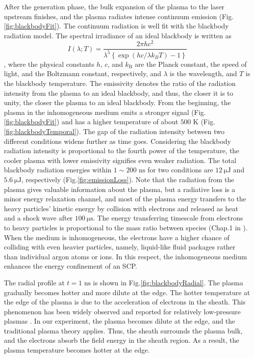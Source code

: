 After the generation phase, the bulk expansion of the plasma to the laser upstream finishes, and the plasma radiates intense continuum emission (Fig.\ref{fig:blackbodyFit}). The continuum radiation is well fit with the blackbody radiation model. The spectral irradiance of an ideal blackbody is written as
\begin{equation}
I \left( \lambda ; T \right) = \frac{2 \pi h c^{2}}{\lambda^{5}\left\{\exp \left(h c / \lambda k_{B} T\right)-1\right\}}
\end{equation}
, where the physical constants $h$, $c$, and $k_\text{B}$ are the Planck constant, the speed of light, and the Boltzmann constant, respectively, and $\lambda$ is the wavelength, and $T$ is the blackbody temperature. The emissivity denotes the ratio of the radiation intensity from the plasma to an ideal blackbody, and thus, the closer it is to unity, the closer the plasma to an ideal blackbody. From the beginning, the plasma in the inhomogeneous medium emits a stronger signal (Fig.\ref{fig:blackbodyFit}) and has a higher temperature of about $500 \text{ K}$ (Fig.\ref{fig:blackbodyTemporal}). The gap of the radiation intensity between two different conditions widens further as time goes. Considering the blackbody radiation intensity is proportional to the fourth power of the temperature, the cooler plasma with lower emissivity signifies even weaker radiation. The total blackbody radiation energies within $1 \sim 200 \text{ ns}$ for two conditions are $12 ~\mathrm{\mu} \text{J}$ and $5.6 ~\mathrm{\mu} \text{J}$, respectively (Fig.\ref{fig:emissionLoss}). Note that the radiation from the plasma gives valuable information about the plasma, but a radiative loss is a minor energy relaxation channel, and most of the plasma energy transfers to the heavy particles’ kinetic energy by collision with electrons and released as heat and a shock wave after $100 ~\mathrm{\mu} \text{s}$. The energy transferring timescale from electrons to heavy particles is proportional to the mass ratio between species (Chap.1 in \cite{bellan2008fundamentals}). When the medium is inhomogeneous, the electrons have a higher chance of colliding with even heavier particles, namely, liquid-like fluid packages rather than individual argon atoms or ions. In this respect, the inhomogeneous medium enhances the energy confinement of an SCP.

The radial profile at $t=1 \text{ ns}$ is shown in Fig.\ref{fig:blackbodyRadial}. The plasma gradually becomes hotter and more dilute at the edge. The hotter temperature at the edge of the plasma is due to the acceleration of electrons in the sheath. This phenomenon has been widely observed and reported for relatively low-pressure plasmas \cite{van2012laser}. In our experiment, the plasma becomes dilute at the edge, and the traditional plasma theory applies. Thus, the sheath surrounds the plasma bulk, and the electrons absorb the field energy in the sheath region. As a result, the plasma temperature becomes hotter at the edge.


